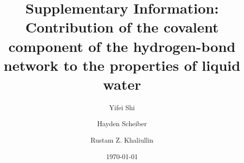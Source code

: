 \documentclass[aps,prl,reprint,amsmath,amssymb]{revtex4-1}
\newcommand*{\MAINTEXT}{}
\begin{document}
\newcommand{\Ang}{\ensuremath{\mathring{\text{A}}}}
\newcommand{\ltwid}{\mathrel{\raise.3ex\hbox{$<$\kern-.75em\lower1ex\hbox{$\sim$}}}}
\newcommand{\gtwid}{\mathrel{\raise.3ex\hbox{$>$\kern-.75em\lower1ex\hbox{$\sim$}}}}
\newcommand{\bra}{\langle}
\newcommand{\ket}{\rangle}
\newcommand{\sill}{\psi}
\newcommand{\trace}{{\rm Tr}}
\newcommand{\ntilde}{\tilde{n}}
\newcommand{\stilde}{\tilde{s}}
\newcommand{\atilde}{\tilde{\alpha}}
\newcommand{\new}{\color{red}}
\newcommand{\blue}{\color{blue}}
\newcommand{\old}{\color{black}}
\newcommand{\bea}{\begin{eqnarray}}
\newcommand{\eea}{\end{eqnarray}}
\def\nn{\nonumber\\}




\title{
\ifdefined\MAINTEXT
\else
Supplementary Information: \\
\fi
Contribution of the covalent component of the hydrogen-bond network to the properties of liquid water
}

\author{Yifei Shi}
\author{Hayden Scheiber}
\author{Rustam Z. Khaliullin}

\date{\today}

\ifdefined\MAINTEXT
\end{document}
